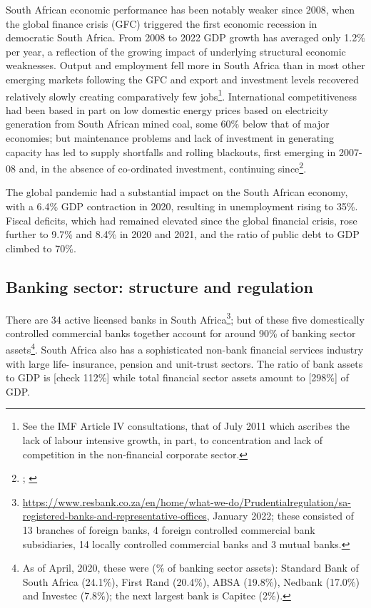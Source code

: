 \documentclass[
]{article}
\begin{document}
South African economic performance has been notably weaker since 2008, when the global finance crisis (GFC) triggered the first economic recession in democratic South Africa. From 2008 to 2022 GDP growth has averaged only 1.2\% per year, a reflection of the growing impact of underlying structural economic weaknesses. Output and employment fell more in South Africa than in most other emerging markets following the GFC and export and investment levels recovered relatively slowly creating comparatively few jobs\footnote{See the IMF Article IV consultations, that of July 2011 which ascribes the lack of labour intensive growth, in part, to concentration and lack of competition in the non-financial corporate sector.}. International competitiveness had been based in part on low domestic energy prices based on electricity generation from South African mined coal, some 60\% below that of major economies; but maintenance problems and lack of investment in generating capacity has led to supply shortfalls and rolling blackouts, first emerging in 2007-08 and, in the absence of co-ordinated investment, continuing since\footnote{\citet{ateba2019strategic}; \citet{folly2021competition}}.

The global pandemic had a substantial impact on the South African economy, with a 6.4\% GDP contraction in 2020, resulting in unemployment rising to 35\%. Fiscal deficits, which had remained elevated since the global financial crisis, rose further to 9.7\% and 8.4\% in 2020 and 2021, and the ratio of public debt to GDP climbed to 70\%.

\hypertarget{banking-sector-structure-and-regulation}{%
\subsection{Banking sector: structure and regulation}\label{banking-sector-structure-and-regulation}}

There are 34 active licensed banks in South Africa\footnote{\url{https://www.resbank.co.za/en/home/what-we-do/Prudentialregulation/sa-registered-banks-and-representative-offices}, January 2022; these consisted of 13 branches of foreign banks, 4 foreign controlled commercial bank subsidiaries, 14 locally controlled commercial banks and 3 mutual banks.}; but of these five domestically controlled commercial banks together account for around 90\% of banking sector assets\footnote{As of April, 2020, these were (\% of banking sector assets): Standard Bank of South Africa (24.1\%), First Rand (20.4\%), ABSA (19.8\%), Nedbank (17.0\%) and Investec (7.8\%); the next largest bank is Capitec (2\%).}. South Africa also has a sophisticated non-bank financial services industry with large life- insurance, pension and unit-trust sectors. The ratio of bank assets to GDP is {[}check 112\%{]} while total financial sector assets amount to {[}298\%{]} of GDP.
\end{document}
